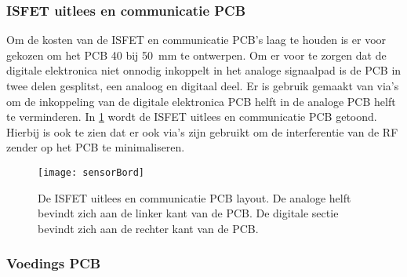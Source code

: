 \subsubsection{ISFET uitlees en communicatie PCB}
Om de kosten van de ISFET en communicatie PCB's laag te houden is er voor gekozen om het PCB 40 bij \qty{50}{\milli\meter} te ontwerpen. Om er voor te zorgen dat de digitale elektronica niet onnodig inkoppelt in het analoge signaalpad is de PCB in twee delen gesplitst, een analoog en digitaal deel. Er is gebruik gemaakt van via's om de inkoppeling van de digitale elektronica PCB helft in de analoge PCB helft te verminderen. In \cref{fig:sensorPCB} wordt de ISFET uitlees en communicatie PCB getoond. Hierbij is ook te zien dat er ook via's zijn gebruikt om de interferentie van de RF zender op het PCB te minimaliseren.
\begin{figure}[!htb]
    \centering
    \texttt{[image: sensorBord]}
    \caption{De ISFET uitlees en communicatie PCB layout. De analoge helft bevindt zich aan de linker kant van de PCB. De digitale sectie bevindt zich aan de rechter kant van de PCB.}
    \label{fig:sensorPCB}
\end{figure}

\subsubsection{Voedings PCB}


